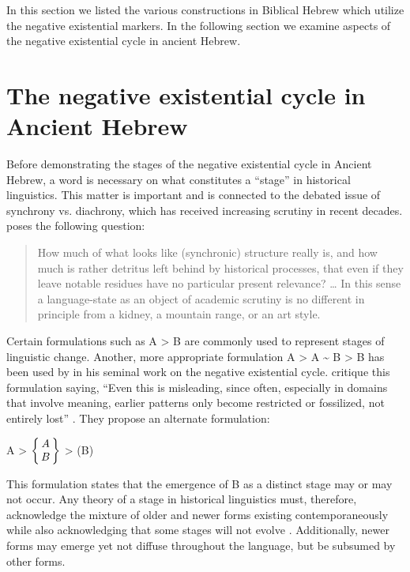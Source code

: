 \documentclass[output=paper,colorlinks,citecolor=brown,draft,draftmode]{langscibook}
\begin{document}
In this section we listed the various constructions in Biblical Hebrew which utilize the negative existential markers. In the following section we examine aspects of the negative existential cycle in ancient Hebrew. 

\section{The negative existential cycle in Ancient
Hebrew}\label{sec:Hebrew-3}

Before demonstrating the stages of the negative existential cycle in
Ancient Hebrew, a word is necessary on what constitutes a ``stage'' in historical linguistics. This matter is important and is connected to the debated issue of synchrony vs. diachrony, which has received increasing scrutiny in recent decades. \citet[12]{Lass1997} poses the following question:

%
\begin{quote}
How much of what looks like (synchronic) structure really is, and how much
is rather detritus left behind by historical processes, that even if they
leave notable residues have no particular present relevance? \ldots{} In this sense a language-state as an object of academic scrutiny is no different in principle from a kidney, a mountain range, or an art style. 
\end{quote}
%
Certain formulations such as A > B are commonly used to represent stages of
linguistic change. Another, more appropriate formulation A > A
{\textasciitilde} B > B has been used by \citet{Croft1991} in his seminal
work on the negative existential cycle. \citeauthor{BrintonTraugott2005} critique
this formulation saying, ``Even this is misleading, since often, especially
in domains that involve meaning, earlier patterns only become restricted or
fossilized, not entirely lost'' \parencite[6]{BrintonTraugott2005}. They propose an alternate formulation:

%
\ea
A > %
$\left\{\begin{array}{@{\,}c@{\,}} A\\B \end{array}\right\}$ > (B)
\z
%

This formulation states that the emergence of B as a distinct stage may or
may not occur. Any theory of a stage in historical linguistics must,
therefore, acknowledge the mixture of older and newer forms existing
contemporaneously while also acknowledging that some stages will not evolve
\parencites(see also)()[22--25]{Croft1991}{Veselinova2016}. Additionally, newer forms may emerge yet not diffuse throughout the language, but be subsumed by other forms.
\end{document}
